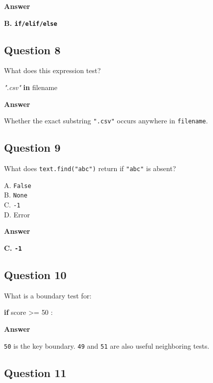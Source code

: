 \documentclass[
  11pt,
  a4paper,
]{article}
\newenvironment{Shaded}{}{}
\newcommand{\CommentTok}[1]{\textcolor[rgb]{0.38,0.63,0.69}{\textit{#1}}}
\newcommand{\ControlFlowTok}[1]{\textcolor[rgb]{0.00,0.44,0.13}{\textbf{#1}}}
\newcommand{\DecValTok}[1]{\textcolor[rgb]{0.25,0.63,0.44}{#1}}
\newcommand{\KeywordTok}[1]{\textcolor[rgb]{0.00,0.44,0.13}{\textbf{#1}}}
\newcommand{\NormalTok}[1]{#1}
\newcommand{\OperatorTok}[1]{\textcolor[rgb]{0.40,0.40,0.40}{#1}}
\begin{document}
\textbf{Answer}

\textbf{B. \texttt{if/elif/else}}

\subsection{Question 8}\label{question-8}

What does this expression test?

\begin{Shaded}
\begin{Highlighting}[]
\CommentTok{".csv"} \KeywordTok{in}\NormalTok{ filename}
\end{Highlighting}
\end{Shaded}

\textbf{Answer}

Whether the exact substring \texttt{".csv"} occurs anywhere in
\texttt{filename}.

\subsection{Question 9}\label{question-9}

What does \texttt{text.find("abc")} return if \texttt{"abc"} is absent?

A. \texttt{False}\\
B. \texttt{None}\\
C. \texttt{-1}\\
D. Error

\textbf{Answer}

\textbf{C. \texttt{-1}}

\subsection{Question 10}\label{question-10}

What is a boundary test for:

\begin{Shaded}
\begin{Highlighting}[]
\ControlFlowTok{if}\NormalTok{ score }\OperatorTok{\textgreater{}=} \DecValTok{50}\NormalTok{ :}
\end{Highlighting}
\end{Shaded}

\textbf{Answer}

\texttt{50} is the key boundary. \texttt{49} and \texttt{51} are also
useful neighboring tests.

\subsection{Question 11}\label{question-11}
\end{document}
